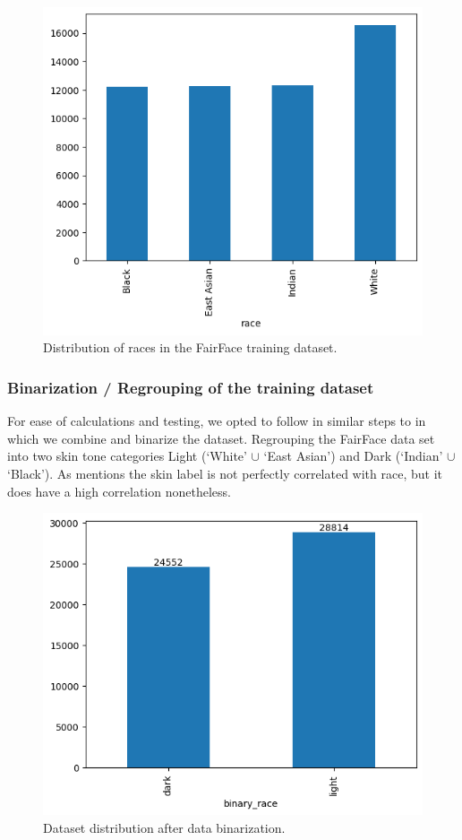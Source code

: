 \documentclass[conference]{IEEEtran}
\begin{document}
\begin{figure}
    \centerline{\includegraphics[width=0.8\linewidth]{latex/images/fairFaceOriginalDistribution.png}}
    \caption{Distribution of races in the FairFace training dataset.}
    \label{racial_distribution}
\end{figure}

\subsubsection{Binarization / Regrouping of the training dataset}
For ease of calculations and testing, we opted to follow in similar steps to\cite{dhar2022distill} in which we combine and binarize the dataset. Regrouping the FairFace\cite{karkkainen2021fairface} data set into two skin tone categories Light (‘White’ $\cup$ ‘East Asian’) and Dark (‘Indian’ $\cup$ ‘Black’). As \cite{dhar2022distill} mentions the skin label is not perfectly correlated with race, but it does have a high correlation nonetheless. 

\begin{figure}
    \centerline{\includegraphics[width=0.8\linewidth]{latex/images/RegroupDistributionFairFace.png}}
    \caption{Dataset distribution after data binarization.}
    \label{binarized_data}
\end{figure}
\end{document}

